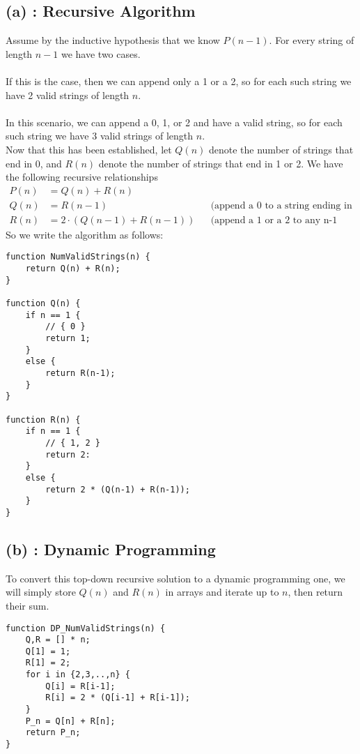 \documentclass{article}
\begin{document}
\subsection*{(a) : Recursive Algorithm}
Assume by the inductive hypothesis that we know $P(n-1)$. For every string of length $n-1$
we have two cases.\\\\
 If this is the case, then we can append only a 1 or a 2, so
for each such string we have 2 valid strings of length $n$.\\\\
 In this scenario, we can append a 0, 1, or 2 and have
a valid string, so for each such string we have 3 valid strings of length $n$. \\
Now that this has been established, let $Q(n)$ denote the number of strings that end in 0,
and $R(n)$ denote the number of strings that end in 1 or 2.
We have the following recursive relationships
\begin{align*}
    P(n) &= Q(n) + R(n)\\
    Q(n) &= R(n-1) && \text{(append a 0 to a string ending in 1 or 2)}\\
    R(n) &= 2 \cdot (Q(n-1) + R(n - 1)) && \text{(append a 1 or a 2 to any n-1 length string)}
\end{align*}
So we write the algorithm as follows:
\begin{verbatim}
function NumValidStrings(n) {
    return Q(n) + R(n);
}

function Q(n) {
    if n == 1 {
        // { 0 }
        return 1;
    }
    else {
        return R(n-1);
    }
}

function R(n) {
    if n == 1 {
        // { 1, 2 }
        return 2:
    }
    else {
        return 2 * (Q(n-1) + R(n-1));
    }
}
\end{verbatim}
\subsection*{(b) : Dynamic Programming}
To convert this top-down recursive solution to a dynamic programming one, we will simply store
$Q(n)$ and $R(n)$ in arrays and iterate up to $n$, then return their sum.
\begin{verbatim}
function DP_NumValidStrings(n) {
    Q,R = [] * n;
    Q[1] = 1;
    R[1] = 2;
    for i in {2,3,..,n} {
        Q[i] = R[i-1];
        R[i] = 2 * (Q[i-1] + R[i-1]);
    }
    P_n = Q[n] + R[n];
    return P_n;
}
\end{verbatim}
\end{document}
